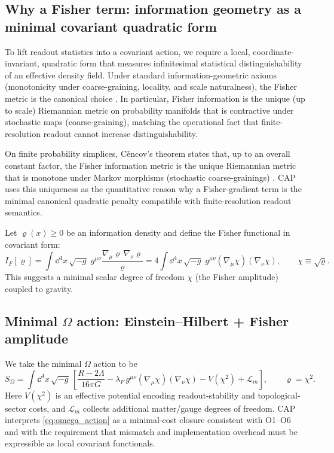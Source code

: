 \subsection{Why a Fisher term: information geometry as a minimal covariant quadratic form}
\label{subsec:fisher}

To lift readout statistics into a covariant action, we require a local, coordinate-invariant, quadratic form that measures infinitesimal statistical distinguishability of an effective density field. Under standard information-geometric axioms (monotonicity under coarse-graining, locality, and scale naturalness), the Fisher metric is the canonical choice \cite{AmariNagaoka2000,Cencov1982}. In particular, Fisher information is the unique (up to scale) Riemannian metric on probability manifolds that is contractive under stochastic maps (coarse-graining), matching the operational fact that finite-resolution readout cannot increase distinguishability.

\begin{remark}
On finite probability simplices, C{\v{e}}ncov's theorem states that, up to an overall constant factor, the Fisher information metric is the unique Riemannian metric that is monotone under Markov morphisms (stochastic coarse-grainings) \cite{Cencov1982,AmariNagaoka2000}. CAP uses this uniqueness as the quantitative reason why a Fisher-gradient term is the minimal canonical quadratic penalty compatible with finite-resolution readout semantics.
\end{remark}

Let $\varrho(x)\ge 0$ be an information density and define the Fisher functional in covariant form:
\begin{equation}
  I_F[\varrho]
  =\int \dd^{4}x\, \sqrt{-g}\;
  g^{\mu\nu}\frac{\nabla_{\mu}\varrho\,\nabla_{\nu}\varrho}{\varrho}
  =4\int \dd^{4}x\, \sqrt{-g}\;
  g^{\mu\nu}(\nabla_{\mu}\chi)(\nabla_{\nu}\chi),
  \qquad
  \chi\equiv \sqrt{\varrho}.
\end{equation}
This suggests a minimal scalar degree of freedom $\chi$ (the Fisher amplitude) coupled to gravity.

\subsection{Minimal \texorpdfstring{$\Omega$}{Omega} action: Einstein--Hilbert + Fisher amplitude}
\label{subsec:omega_action}

We take the minimal $\Omega$ action to be
\begin{equation}
\label{eq:omega_action}
  S_{\Omega}
  =\int \dd^{4}x\,\sqrt{-g}\,
  \left[
    \frac{R-2\Lambda}{16\pi G}
    -\lambda_{F}\, g^{\mu\nu}(\nabla_{\mu}\chi)(\nabla_{\nu}\chi)
    -V(\chi^{2})
    +\mathcal{L}_{m}
  \right],
  \qquad
  \varrho=\chi^{2}.
\end{equation}
Here $V(\chi^{2})$ is an effective potential encoding readout-stability and topological-sector costs, and $\mathcal{L}_{m}$ collects additional matter/gauge degrees of freedom. CAP interprets \eqref{eq:omega_action} as a minimal-cost closure consistent with O1--O6 and with the requirement that mismatch and implementation overhead must be expressible as local covariant functionals.

